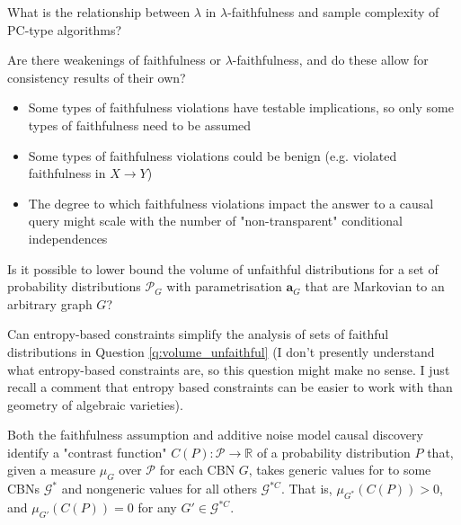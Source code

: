 \begin{question}
    What is the relationship between $\lambda$ in $\lambda$-faithfulness and sample complexity of PC-type algorithms?
\end{question}

\begin{question}
    Are there weakenings of faithfulness or $\lambda$-faithfulness, and do these allow for consistency results of their own?
    \begin{itemize}
        \item Some types of faithfulness violations have testable implications, so only some types of faithfulness need to be assumed \cite{ramsey_adjacency-faithfulness_2012}
        \item Some types of faithfulness violations could be benign (e.g. violated faithfulness in $X\to Y$) \cite{peters_structural_2013}
        \item The degree to which faithfulness violations impact the answer to a causal query might scale with the number of "non-transparent" conditional independences 
    \end{itemize}
\end{question}

\begin{question}\label{q:volume_unfaithful}
    Is it possible to lower bound the volume of unfaithful distributions for a set of probability distributions $\mathcal{P}_G$ with parametrisation $\mathbf{a}_G$ that are Markovian to an arbitrary graph $G$? \cite{uhler_geometry_2013}
\end{question}

\begin{question}
    Can entropy-based constraints simplify the analysis of sets of faithful distributions in Question \ref{q:volume_unfaithful} (I don't presently understand what entropy-based constraints are, so this question might make no sense. I just recall a comment that entropy based constraints can be easier to work with than geometry of algebraic varieties).
\end{question}

Both the faithfulness assumption and additive noise model causal discovery identify a "contrast function" $C(P):\mathcal{P}\to\mathbb{R}$ of a probability distribution $P$ that, given a measure $\mu_G$ over $\mathcal{P}$ for each CBN $G$, takes generic values for to some CBNs $\mathcal{G}^*$ and nongeneric values for all others $\mathcal{G}^{*C}$. That is, $\mu_{G^*}(C(P))>0$, and $\mu_{G'}(C(P))=0$ for any $G'\in\mathcal{G}^{*C}$.

